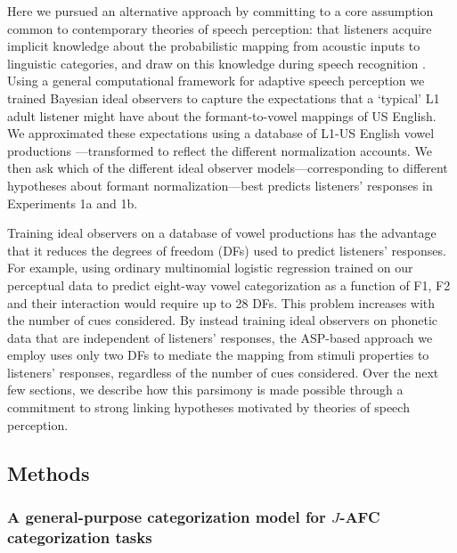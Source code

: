 \documentclass[preprint]{JASA}
\begin{document}
Here we pursued an alternative approach by committing to a core assumption common to contemporary theories of speech perception: that listeners acquire implicit knowledge about the probabilistic mapping from acoustic inputs to linguistic categories, and draw on this knowledge during speech recognition \citetext{\citealp[e.g., TRACE,][]{mcclelland-elman1986}; \citealp[exemplar theory,][]{johnson1997}; \citealp[Bayesian accounts,][]{luce-pisoni1998}; \citealp{nearey1990}; \citealp{norris-mcqueen2008}; \citealp[ASR-inspired models like DIANA or EARSHOT,][]{bosch2015}; \citealp{magnuson2020}}. Using a general computational framework for adaptive speech perception \citep[ASP,][]{xie2023} we trained Bayesian ideal observers to capture the expectations that a `typical' L1 adult listener might have about the formant-to-vowel mappings of US English. We approximated these expectations using a database of L1-US English vowel productions \citep{xie-jaeger2020}---transformed to reflect the different normalization accounts. We then ask which of the different ideal observer models---corresponding to different hypotheses about formant normalization---best predicts listeners' responses in Experiments 1a and 1b.

Training ideal observers on a database of vowel productions has the advantage that it reduces the degrees of freedom (DFs) used to predict listeners' responses. For example, using ordinary multinomial logistic regression trained on our perceptual data to predict eight-way vowel categorization as a function of F1, F2 and their interaction would require up to 28 DFs. This problem increases with the number of cues considered. By instead training ideal observers on phonetic data that are independent of listeners' responses, the ASP-based approach we employ uses only two DFs to mediate the mapping from stimuli properties to listeners' responses, regardless of the number of cues considered. Over the next few sections, we describe how this parsimony is made possible through a commitment to strong linking hypotheses motivated by theories of speech perception.

\subsection{Methods}\label{methods}

\subsubsection{\texorpdfstring{A general-purpose categorization model for \(J\)-AFC categorization tasks}{A general-purpose categorization model for J-AFC categorization tasks}}\label{sec:predict-perception}
\end{document}
